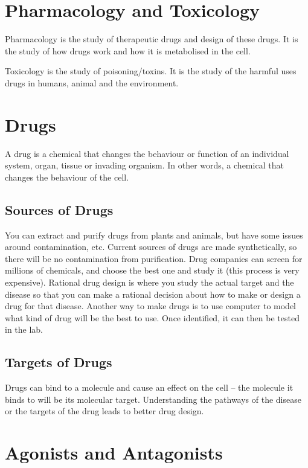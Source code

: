 \section{Pharmacology and Toxicology}

Pharmacology is the study of therapeutic drugs and design of these drugs.
It is the study of how drugs work and how it is metabolised in the cell.

Toxicology is the study of poisoning/toxins.
It is the study of the harmful uses drugs in humans, animal and the environment.

\section{Drugs}

A drug is a chemical that changes the behaviour or function of an individual system, organ, tissue or invading organism.
In other words, a chemical that changes the behaviour of the cell.

\subsection{Sources of Drugs}

You can extract and purify drugs from plants and animals, but have some issues around contamination, etc.
Current sources of drugs are made synthetically, so there will be no contamination from purification.
Drug companies can screen for millions of chemicals, and choose the best one and study it (this process is very expensive).
Rational drug design is where you study the actual target and the disease so that you can make a rational decision about how to make or design a drug for that disease.
Another way to make drugs is to use computer to model what kind of drug will be the best to use.
Once identified, it can then be tested in the lab.

\subsection{Targets of Drugs}

Drugs can bind to a molecule and cause an effect on the cell -- the molecule it binds to will be its molecular target.
Understanding the pathways of the disease or the targets of the drug leads to better drug design.

\section{Agonists and Antagonists}

